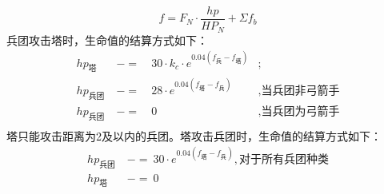 \documentclass[a4paper,4pt]{article}
\begin{document}
\begin{equation}
	f = F_N \cdot \frac{hp}{HP_N} + \Sigma f_b\label{f}
\end{equation}
兵团攻击塔时，生命值的结算方式如下：
\begin{equation}
	\begin{aligned}
		hp_{\text{塔}}   & \ -= & \ 30 \cdot k_c \cdot e^{0.04(f_{\text{兵}}-f_{\text{塔}})} & ;                       \\
		hp_{\text{兵团}} & \ -= & \ 28 \cdot e^{0.04(f_{\text{塔}}-f_{\text{兵}})}           & , \text{当兵团非弓箭手} \\
		hp_{\text{兵团}} & \ -= & \ 0                                                        & , \text{当兵团为弓箭手} \\
	\end{aligned}
	\label{hp1}
\end{equation}
塔只能攻击距离为2及以内的兵团。塔攻击兵团时，生命值的结算方式如下：
\begin{equation}
	\begin{aligned}
		hp_{\text{兵团}} & \ -=\ 30 \cdot e^{0.04(f_{\text{塔}}-f_{\text{兵}})}, \text{对于所有兵团种类} \\
		hp_{\text{塔}}   & \ -=\ 0                                                                       \\
	\end{aligned}
	\label{hp2}
\end{equation}
\end{document}
